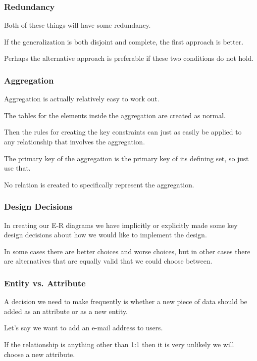 \begin{frame}
\frametitle{Redundancy}

Both of these things will have some redundancy. 

If the generalization is both disjoint and complete, the first approach is better.

Perhaps the alternative approach is preferable if these two conditions do not hold.

\end{frame}



\begin{frame}
\frametitle{Aggregation}

Aggregation is actually relatively easy to work out. 

The tables for the elements inside the aggregation are created as normal. 

Then the rules for creating the key constraints can just as easily be applied to any relationship that involves the aggregation. 

The primary key of the aggregation is the primary key of its defining set, so just use that. 

No relation is created to specifically represent the aggregation.

\end{frame}



\begin{frame}
\frametitle{Design Decisions}

In creating our E-R diagrams we have implicitly or explicitly made some key design decisions about how we would like to implement the design. 

In some cases there are better choices and worse choices, but in other cases there are alternatives that are equally valid that we could choose between.

\end{frame}



\begin{frame}
\frametitle{Entity vs. Attribute}

A decision we need to make frequently is whether a new piece of data should be added as an attribute or as a new entity. 
 
Let's say we want to add an e-mail address to users.

If the relationship is anything other than 1:1 then it is very unlikely we will choose a new attribute.

\end{frame}



